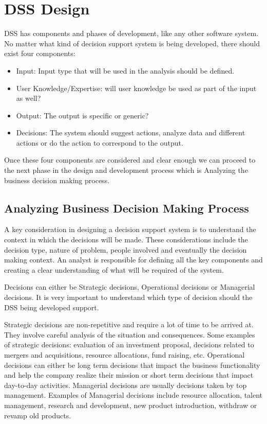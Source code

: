 \section{DSS Design}
\label{sec:DSSDesign}
DSS has components and phases of development, like any other software system. No matter what kind of decision support system is being developed, there should exist four components:
\begin{itemize}
	\item Input: Input type that will be used in the analysis should be defined.
	\item User Knowledge/Expertise: will user knowledge be used as part of the input as well?
	\item Output: The output is specific or generic?
	\item Decisions: The system should suggest actions, analyze data and different actions or do the action to correspond to the output.
\end{itemize}
Once these four components are considered and clear enough we can proceed to the next phase in the design and development process which is Analyzing the business decision making process.

\subsection{Analyzing Business Decision Making Process}
A key consideration in designing a decision support system is to understand the context in which the decisions will be made. These considerations include the decision type, nature of problem, people involved and eventually the decision making context.\cite{DSS} An analyst is responsible for defining all the key components and creating a clear understanding of what will be required of the system.

Decisions can either be Strategic decisions, Operational decisions or Managerial decisions. It is very important to understand which type of decision should the DSS being developed support. 

Strategic decisions are non-repetitive and require a lot of time to be arrived at. They involve careful analysis of the situation and consequences. Some examples of strategic decisions: evaluation of an investment proposal, decisions related to mergers and acquisitions, resource allocations, fund raising, etc.\cite{DSS} Operational decisions can either be long term decisions that impact the business functionality and help the company realize their mission or short term decisions that impact day-to-day activities.\cite{DSS} Managerial decisions are usually decisions taken by top management. Examples of Managerial decisions include resource allocation, talent management, research and development, new product introduction, withdraw or revamp old products.\cite{DSS}

